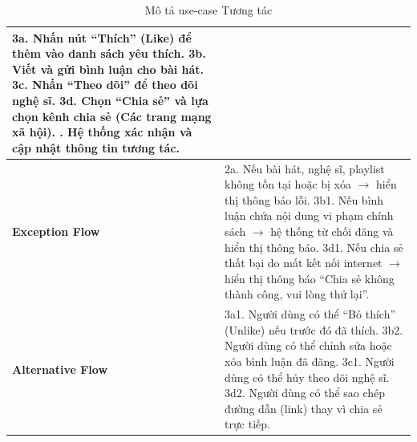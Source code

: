 \documentclass[a4paper]{article}
\newcommand{\cach}{\hspace*{1.5em}\ignorespaces}
\begin{document}
\begin{table}[H]
\begin{tabularx}{\textwidth}{|l|X|}
		\cach 3a. Nhấn nút “Thích” (Like) để thêm vào danh sách yêu thích. \newline
		\cach 3b. Viết và gửi bình luận cho bài hát. \newline
		\cach 3c. Nhấn “Theo dõi” để theo dõi nghệ sĩ. \newline
		\cach 3d. Chọn “Chia sẻ” và lựa chọn kênh chia sẻ (Các trang mạng xã \cach hội). \newline
		4. Hệ thống xác nhận và cập nhật thông tin tương tác.                                                                                                                                                           \\ \hline
		\textbf{Exception Flow}
		                       & 2a. Nếu bài hát, nghệ sĩ, playlist không tồn tại hoặc bị xóa $\rightarrow$ hiển thị thông báo lỗi. \newline
		3b1. Nếu bình luận chứa nội dung vi phạm chính sách $\rightarrow$ hệ thống từ chối đăng và hiển thị thông báo. \newline
		3d1. Nếu chia sẻ thất bại do mất kết nối internet $\rightarrow$ hiển thị thông báo “Chia sẻ không thành công, vui lòng thử lại”.                                                                                \\ \hline
		\textbf{Alternative Flow}
		                       & 3a1. Người dùng có thể “Bỏ thích” (Unlike) nếu trước đó đã thích. \newline
		3b2. Người dùng có thể chỉnh sửa hoặc xóa bình luận đã đăng. \newline
		3c1. Người dùng có thể hủy theo dõi nghệ sĩ. \newline
		3d2. Người dùng có thể sao chép đường dẫn (link) thay vì chia sẻ trực tiếp.                                                                                                                                     \\ \hline
	\end{tabularx}
	\caption{Mô tả use-case Tương tác}
\end{table}

\end{document}
